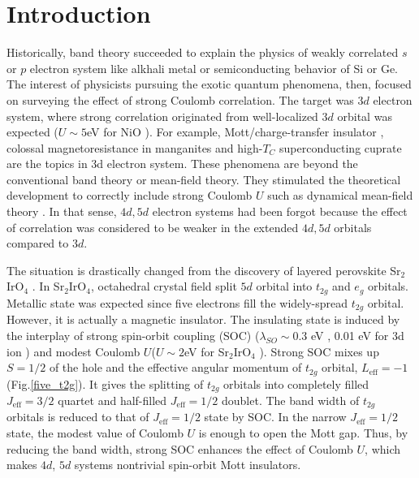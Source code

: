 \chapter{Introduction}
Historically, band theory succeeded to explain the physics of weakly correlated $s$ or $p$ electron system like alkhali metal or semiconducting behavior of Si or Ge.
The interest of physicists pursuing the exotic quantum phenomena, then, focused on surveying the effect of strong Coulomb correlation.
The target was $3d$ electron system, where strong correlation originated from well-localized $3d$ orbital was expected ($U \sim 5$eV for NiO \cite{bengone2000implementation}).
For example, Mott/charge-transfer insulator \cite{arima1993variation}, colossal magnetoresistance in manganites \cite{dagotto2005complexity}
and high-$T_C$ superconducting cuprate \cite{dagotto2005complexity} are the topics in 3d electron system.
These phenomena are beyond the conventional band theory or mean-field theory.
They stimulated the theoretical development to correctly include strong Coulomb $U$ such as dynamical mean-field theory \cite{georges1996dynamical}.
In that sense, $4d, 5d$ electron systems had been forgot because the effect of correlation was considered to be weaker in the extended $4d, 5d$ orbitals compared to $3d$.


The situation is drastically changed from the discovery of layered perovskite Sr$_2$IrO$_4$ \cite{kim2008novel, kim2009phase}.
In Sr$_2$IrO$_4$, octahedral crystal field split $5d$ orbital into $t_{2g}$ and $e_g$ orbitals.
Metallic state was expected since five electrons fill the widely-spread $t_{2g}$ orbital.
However, it is actually a magnetic insulator.
The insulating state is induced by the interplay of strong spin-orbit coupling (SOC) ($\lambda_{SO} \sim 0.3$ eV \cite{kim2008novel}, 0.01 eV for 3d ion \cite{Kanamori})
and modest Coulomb $U$($U \sim 2$eV for Sr$_2$IrO$_4$ \cite{arita2012ab}).
Strong SOC mixes up $S = 1/2$ of the hole and the effective angular momentum of $t_{2g}$ orbital, $L_\mathrm{eff} = -1$ (Fig.\ref{five_t2g}).
It gives the splitting of $t_{2g}$ orbitals into completely filled $J_{\mathrm{eff}} = 3/2$ quartet and half-filled $J_{\mathrm{eff}} = 1/2$ doublet.
The band width of $t_{2g}$ orbitals is reduced to that of $J_{\mathrm{eff}} = 1/2$ state by SOC.
In the narrow $J_{\mathrm{eff}} = 1/2$ state, the modest value of Coulomb $U$ is enough to open the Mott gap.
Thus, by reducing the band width, strong SOC enhances the effect of Coulomb $U$, which makes $4d$, $5d$ systems nontrivial spin-orbit Mott insulators.

